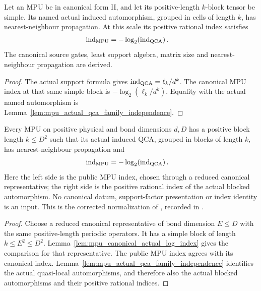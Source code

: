 \begin{lemma}
    \label{lem:mpu_canonical_actual_log_index}
    \leanok
    Let an MPU be in canonical form II, and let its positive-length
    $k$-block tensor be simple. Its named actual induced automorphism,
    grouped in cells of length $k$, has nearest-neighbour propagation.
    At this scale its positive rational index satisfies
    \begin{align}
        \operatorname{ind}_{\rm MPU}
         & =-\log_2\!\left(\operatorname{ind}_{\rm QCA}\right).
    \end{align}
    The canonical source gates, least support algebra, matrix size and
    nearest-neighbour propagation are derived.
\end{lemma}
\begin{proof}
    \leanok
    The actual support formula gives
    $\operatorname{ind}_{\rm QCA}=\ell_k/d^k$.
    The canonical MPU index at that same simple block is
    $-\log_2(\ell_k/d^k)$. Equality with the actual named automorphism
    is Lemma~\ref{lem:mpu_actual_qca_family_independence}.
\end{proof}

\begin{theorem}
    \label{thm:mpu_actual_log_index_comparison}
    \leanok
    Every MPU on positive physical and bond dimensions $d,D$ has a
    positive block length $k\le D^2$ such that its actual induced QCA,
    grouped in blocks of length $k$, has nearest-neighbour propagation
    and
    \begin{align}
        \operatorname{ind}_{\rm MPU}
         & =-\log_2\!\left(\operatorname{ind}_{\rm QCA}\right).
    \end{align}
    Here the left side is the public MPU index, chosen through a reduced
    canonical representative; the right side is the positive rational
    index of the actual blocked automorphism. No canonical datum,
    support-factor presentation or index identity is an input.
    This is the corrected normalization of
    \cite[Appendix, lines~2329--2334]{Cirac2017MPU}, recorded in
    \cite{gap:mpu_qca_index_normalization}.
\end{theorem}
\begin{proof}
    \leanok
    Choose a reduced canonical representative of bond dimension
    $E\le D$ with the same positive-length periodic operators.
    It has a simple block of length $k\le E^2\le D^2$.
    Lemma~\ref{lem:mpu_canonical_actual_log_index} gives the comparison
    for that representative. The public MPU index agrees with its
    canonical index. Lemma~\ref{lem:mpu_actual_qca_family_independence}
    identifies the actual quasi-local automorphisms, and therefore also
    the actual blocked automorphisms and their positive rational indices.
\end{proof}
